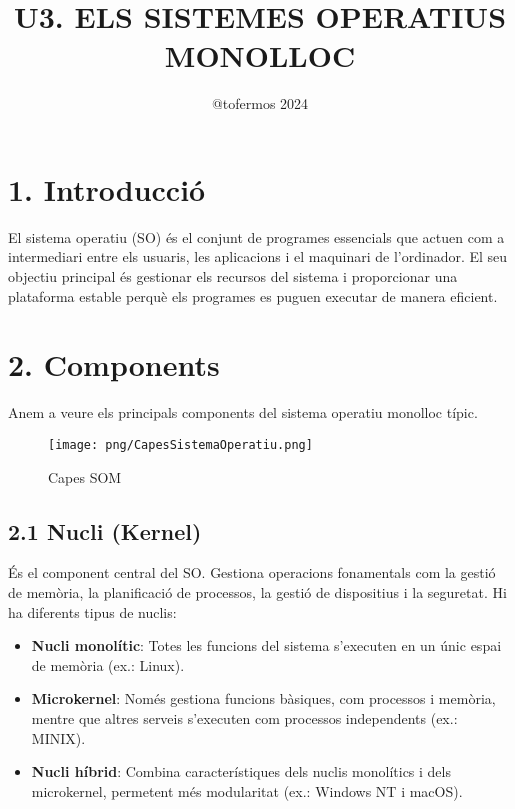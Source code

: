 \documentclass[
  a4paper,
]{article}
\title{U3. ELS SISTEMES OPERATIUS MONOLLOC}
\author{@tofermos 2024}
\date{}
\begin{document}
\maketitle

{
\setcounter{tocdepth}{2}
\tableofcontents
}
\newpage
\renewcommand\tablename{Tabla}

\section{1. Introducció}\label{introducciuxf3}

El sistema operatiu (SO) és el conjunt de programes essencials que
actuen com a intermediari entre els usuaris, les aplicacions i el
maquinari de l'ordinador. El seu objectiu principal és gestionar els
recursos del sistema i proporcionar una plataforma estable perquè els
programes es puguen executar de manera eficient.

\section{2. Components}\label{components}

Anem a veure els principals components del sistema operatiu monolloc
típic.

\begin{figure}
\centering
\texttt{[image: png/CapesSistemaOperatiu.png]}
\caption{Capes SOM}
\end{figure}

\subsection{2.1 Nucli (Kernel)}\label{nucli-kernel}

És el component central del SO. Gestiona operacions fonamentals com la
gestió de memòria, la planificació de processos, la gestió de
dispositius i la seguretat. Hi ha diferents tipus de nuclis:

\begin{itemize}
\item
  \textbf{Nucli monolític}: Totes les funcions del sistema s'executen en
  un únic espai de memòria (ex.: Linux).
\item
  \textbf{Microkernel}: Només gestiona funcions bàsiques, com processos
  i memòria, mentre que altres serveis s'executen com processos
  independents (ex.: MINIX).
\item
  \textbf{Nucli híbrid}: Combina característiques dels nuclis monolítics
  i dels microkernel, permetent més modularitat (ex.: Windows NT i
  macOS).
\end{itemize}
\end{document}
